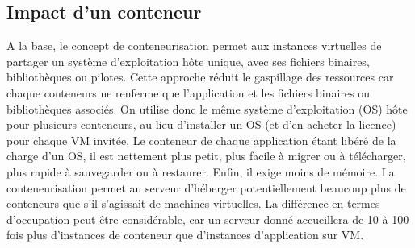 \subsection{Impact d'un conteneur}
A la base, le concept de conteneurisation permet aux instances virtuelles de partager un système d'exploitation hôte unique, avec ses fichiers binaires, bibliothèques ou pilotes. 
Cette approche réduit le gaspillage des ressources car chaque conteneurs ne renferme que l'application et les fichiers binaires ou bibliothèques associés. On utilise donc le même système d'exploitation (OS) hôte pour plusieurs conteneurs, au lieu d'installer un OS (et d'en acheter la licence) pour chaque VM invitée. Le conteneur de chaque application étant libéré de la charge d'un OS, il est nettement plus petit, plus facile à migrer ou à télécharger, plus rapide à sauvegarder ou à restaurer. Enfin, il exige moins de mémoire. La conteneurisation permet au serveur d'héberger potentiellement beaucoup plus de conteneurs que s'il s'agissait de machines virtuelles. La différence en termes d'occupation peut être considérable, car un serveur donné accueillera de 10 à 100 fois plus d'instances de conteneur que d'instances d'application sur VM.
